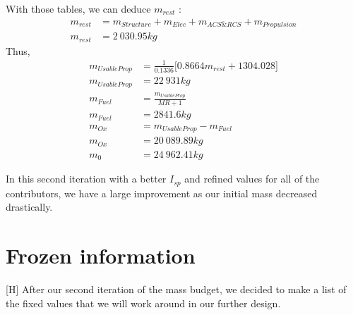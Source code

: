 With those tables, we can deduce $m_{rest}$ :
\begin{align}
m_{rest} &= m_{Structure} + m_{Elec} + m_{ACS\&RCS} + m_{Propulsion}\\
m_{rest} &= 2\ 030.95kg
\end{align}
Thus,
\begin{align}
m_{UsableProp} &= \frac 1{0.1336}\bigg[0.8664 m_{rest} + 1304.028\bigg]\\
m_{UsableProp} &= 22\ 931kg\\
m_{Fuel} &= \frac{m_{UsableProp}}{MR+1}\\
m_{Fuel} &= 2841.6kg\\
m_{Ox} &= m_{UsableProp} - m_{Fuel}\\
m_{Ox} &= 20\ 089.89kg\\
m_0 &= 24\ 962.41kg
\end{align}



In this second iteration with a better \(I_{sp}\) and refined values for all of the contributors, we have a large improvement as our initial mass decreased drastically.
\newpage
\section{Frozen information}[H]
After our second iteration of the mass budget, we decided to make a list of the fixed values that we will work around in our further design.
